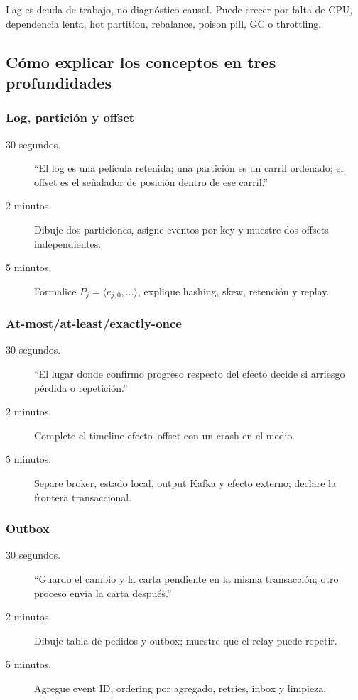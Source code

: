 \documentclass[variant=docente,cover=institutional,mode=screen]{ua-engineering-v6-article}
\begin{document}
Lag es deuda de trabajo, no diagnóstico causal. Puede crecer por falta de CPU, dependencia lenta, hot partition, rebalance, poison pill, GC o throttling.

\subsection{Cómo explicar los conceptos en tres profundidades}

\subsubsection{Log, partición y offset}
\begin{description}
\item[30 segundos.] ``El log es una película retenida; una partición es un carril ordenado; el offset es el señalador de posición dentro de ese carril.''
\item[2 minutos.] Dibuje dos particiones, asigne eventos por key y muestre dos offsets independientes.
\item[5 minutos.] Formalice $P_j=\langle e_{j,0},\ldots\rangle$, explique hashing, skew, retención y replay.
\end{description}

\subsubsection{At-most/at-least/exactly-once}
\begin{description}
\item[30 segundos.] ``El lugar donde confirmo progreso respecto del efecto decide si arriesgo pérdida o repetición.''
\item[2 minutos.] Complete el timeline efecto--offset con un crash en el medio.
\item[5 minutos.] Separe broker, estado local, output Kafka y efecto externo; declare la frontera transaccional.
\end{description}

\subsubsection{Outbox}
\begin{description}
\item[30 segundos.] ``Guardo el cambio y la carta pendiente en la misma transacción; otro proceso envía la carta después.''
\item[2 minutos.] Dibuje tabla de pedidos y outbox; muestre que el relay puede repetir.
\item[5 minutos.] Agregue event ID, ordering por agregado, retries, inbox y limpieza.
\end{description}
\end{document}
